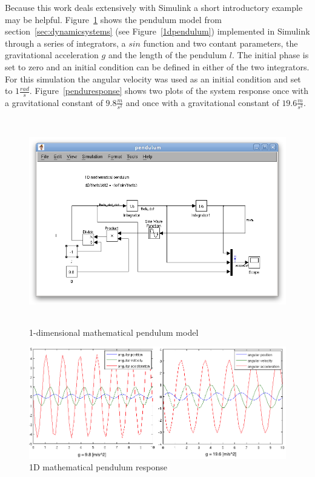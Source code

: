 Because this work deals extensively with Simulink a short introductory example may be helpful. Figure~\ref{pendumodelscreen} shows the pendulum model from section~\ref{sec:dynamicsystems} (see Figure~\ref{1dpendulum}) implemented in Simulink through a series of integrators, a $sin$ function and two contant parameters, the gravitational acceleration $g$ and the length of the pendulum $l$. The initial phase is set to zero and an initial condition can be defined in either of the two integrators. For this simulation the angular velocity was used as an initial condition and set to $1\frac{rad}{s}$. Figure~\ref{penduresponse} shows two plots of the system response once with a gravitational constant of $9.8\frac{m}{s^2}$ and once with a gravitational constant of $19.6\frac{m}{s^2}$.

\begin{figure}[pendumodelscreen]
\begin{center}
\includegraphics[height=9cm]{media/pendmodelscreen.png}
\caption{1-dimensional mathematical pendulum model}
\label{pendumodelscreen}
\end{center}
\end{figure}


\begin{figure}[penduresponse]
\begin{center}
\includegraphics[width=15cm]{media/pendulum_response.png}
\caption{1D mathematical pendulum response}
\label{pendu98}
\end{center}
\end{figure}


